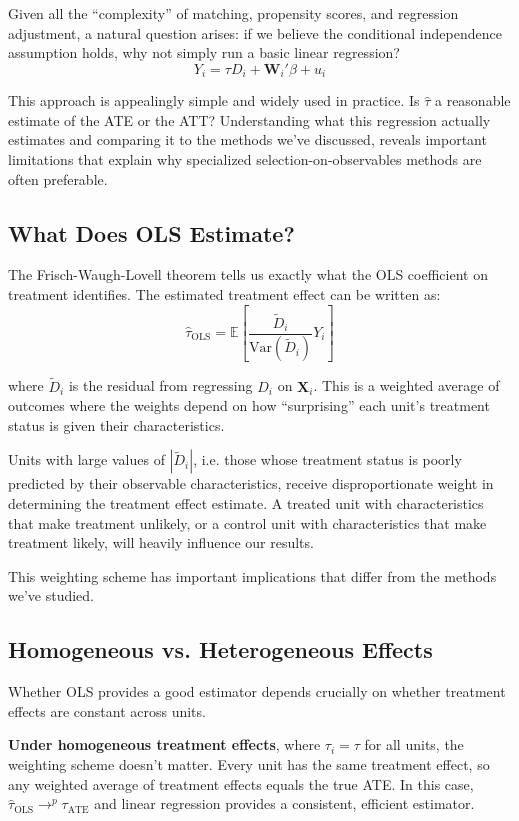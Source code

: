 \documentclass[12pt]{article}
\begin{document}
\begin{multicols}{2}
Given all the ``complexity'' of matching, propensity scores, and regression adjustment, a natural question arises: if we believe the conditional independence assumption holds, why not simply run a basic linear regression?
$$Y_i = \tau D_i + \bm{W}_i'\beta + u_i$$

This approach is appealingly simple and widely used in practice.
Is $\hat{\tau}$ a reasonable estimate of the ATE or the ATT?
Understanding what this regression actually estimates and comparing it to the methods we've discussed, reveals important limitations that explain why specialized selection-on-observables methods are often preferable.

\subsection*{What Does OLS Estimate?}

The Frisch-Waugh-Lovell theorem tells us exactly what the OLS coefficient on treatment identifies.
The estimated treatment effect can be written as:
$$\hat{\tau}_{\text{OLS}} = \mathbb{E}\left[\frac{\tilde{D}_i}{\text{Var}(\tilde{D}_i)} Y_i\right]$$

where $\tilde{D}_i$ is the residual from regressing $D_i$ on $\bm{X}_i$.
This is a weighted average of outcomes where the weights depend on how ``surprising'' each unit's treatment status is given their characteristics.

Units with large values of $|\tilde{D}_i|$, i.e. those whose treatment status is poorly predicted by their observable characteristics, receive disproportionate weight in determining the treatment effect estimate.
A treated unit with characteristics that make treatment unlikely, or a control unit with characteristics that make treatment likely, will heavily influence our results.

This weighting scheme has important implications that differ from the methods we've studied.

\subsection*{Homogeneous vs. Heterogeneous Effects}

Whether OLS provides a good estimator depends crucially on whether treatment effects are constant across units.

\textbf{Under homogeneous treatment effects}, where $\tau_i = \tau$ for all units, the weighting scheme doesn't matter.
Every unit has the same treatment effect, so any weighted average of treatment effects equals the true ATE.
In this case, $\hat{\tau}_{\text{OLS}} \to^p \tau_{\text{ATE}}$ and linear regression provides a consistent, efficient estimator.


\end{multicols}
\end{document}
